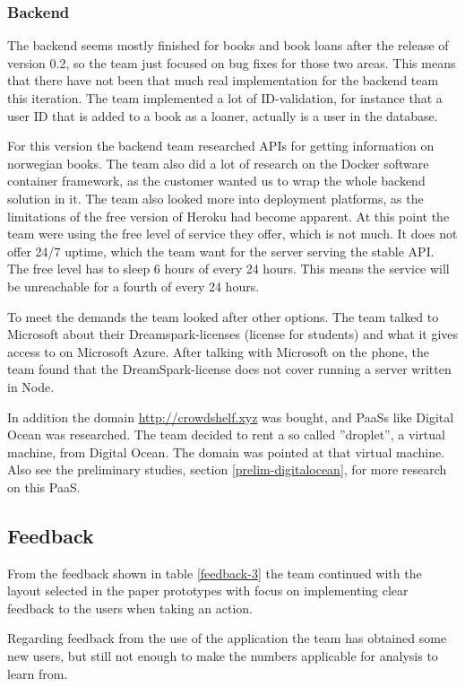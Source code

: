\subsubsection{Backend}
The \gls{backend} seems mostly finished for books and book loans after the release of version 0.2, so the team just focused on bug fixes for those two areas. This means that there have not been that much real implementation for the \gls{backend} team this iteration. The team implemented a lot of \gls{ID}-validation, for instance that a user \gls{ID} that is added to a book as a loaner, actually is a user in the database.

For this version the \gls{backend} team researched APIs for getting information on norwegian books. The team also did a lot of research on the Docker software container framework, as the customer wanted us to wrap the whole \gls{backend} solution in it. \cite{docker} The team also looked more into deployment platforms, as the limitations of the free version of Heroku had become apparent. At this point the team were using the free level of service they offer, which is not much. \cite{heroku-pricing} It does not offer 24/7 uptime, which the team want for the server serving the stable API. The free level has to sleep 6 hours of every 24 hours. This means the service will be unreachable for a fourth of every 24 hours. 

To meet the demands the team looked after other options. The team talked to Microsoft about their Dreamspark-licenses (license for students) and what it gives access to on Microsoft Azure. \cite{microsoft-dreamspark} After talking with Microsoft on the phone, the team found that the DreamSpark-license does not cover running a server written in Node.

In addition the domain \url{http://crowdshelf.xyz} was bought, and \gls{PaaS}s like Digital Ocean was researched.\cite{digitalocean} The team decided to rent a so called ''droplet'', a virtual machine, from Digital Ocean. The domain was pointed at that virtual machine. Also see the preliminary studies, section \ref{prelim-digitalocean}, for more research on this \gls{PaaS}.


\subsection{Feedback}
From the feedback shown in table \ref{feedback-3} the team continued with the layout selected in the paper prototypes with focus on implementing clear feedback to the users when taking an action. 

Regarding feedback from the use of the application the team has obtained some new users, but still not enough to make the numbers applicable for analysis to learn from. 

